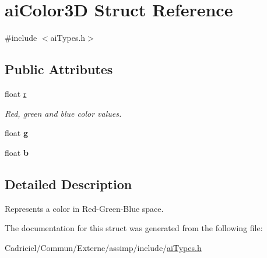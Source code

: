 \hypertarget{structai_color3_d}{\section{ai\-Color3\-D Struct Reference}
\label{structai_color3_d}
}


{\ttfamily \#include $<$ai\-Types.\-h$>$}

\subsection*{Public Attributes}
\begin{DoxyCompactItemize}
\item 
\hypertarget{structai_color3_d_a0ff704458aa26c84bbfe93b2dd89c630}{float \hyperlink{structai_color3_d_a0ff704458aa26c84bbfe93b2dd89c630}{r}}\label{structai_color3_d_a0ff704458aa26c84bbfe93b2dd89c630}

\begin{DoxyCompactList}\small\item\em Red, green and blue color values. \end{DoxyCompactList}\item 
\hypertarget{structai_color3_d_a40ecdcee92b5373cbaa5e00ebcdb2cfb}{float {\bfseries g}}\label{structai_color3_d_a40ecdcee92b5373cbaa5e00ebcdb2cfb}

\item 
\hypertarget{structai_color3_d_a02ddcc7af11f7d4d6ea14f1bfb4ef6c7}{float {\bfseries b}}\label{structai_color3_d_a02ddcc7af11f7d4d6ea14f1bfb4ef6c7}

\end{DoxyCompactItemize}


\subsection{Detailed Description}
Represents a color in Red-\/\-Green-\/\-Blue space. 

The documentation for this struct was generated from the following file\-:\begin{DoxyCompactItemize}
\item 
Cadriciel/\-Commun/\-Externe/assimp/include/\hyperlink{ai_types_8h}{ai\-Types.\-h}\end{DoxyCompactItemize}

